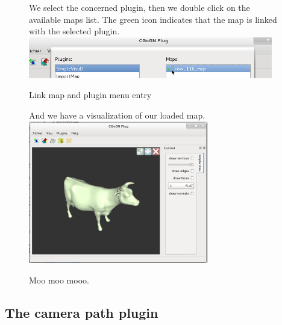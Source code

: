 \documentclass[a4paper]{scrreprt}
\begin{document}
	\begin{figure}[h!p]
		We select the concerned plugin, then we double click on the available maps
		list. The green icon indicates that the map is linked with the selected
		plugin.\\
		\centering
		\includegraphics[width=0.95\textwidth]{images/screenshot17}
		\caption{Link map and plugin menu entry}
	\end{figure}
	\begin{figure}[h!p]
		And we have a visualization of our loaded map.
		\centering
		\includegraphics[width=0.7\textwidth]{images/screenshot18}
		\caption{Moo moo mooo.}
	\end{figure}
	\FloatBarrier
	
\subsection{The camera path plugin}
\end{document}
